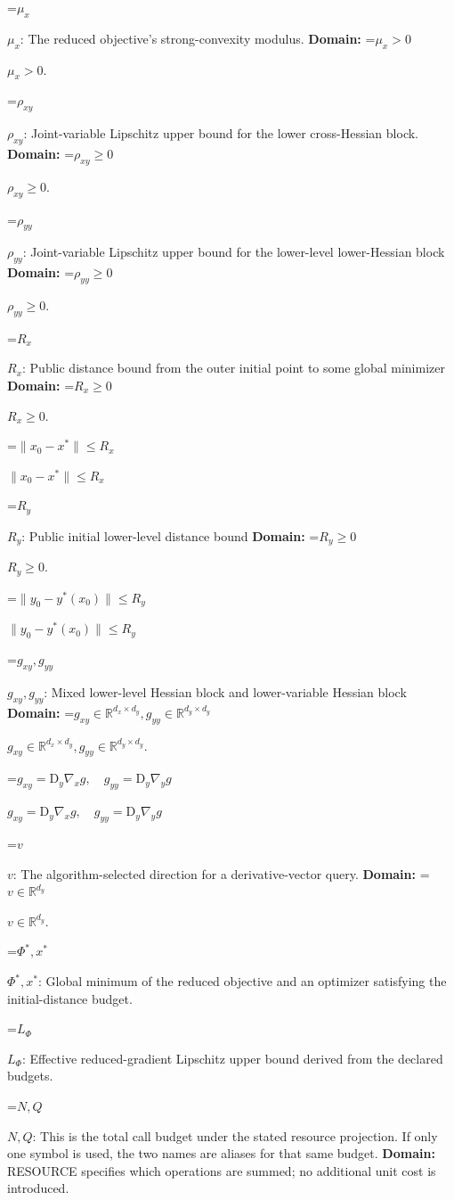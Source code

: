 \documentclass[10pt,a4paper]{article}
\newcommand{\AtlasMath}[1]{\par\begingroup\centering\setbox0=\hbox{$\displaystyle #1$}\ifdim\wd0>1.4\linewidth\typeout{ATLAS WIDE FORMULA: \the\wd0}\fi\ifdim\wd0>\linewidth\resizebox{\linewidth}{!}{\box0}\else\box0\fi\par\endgroup}
\newcommand{\AtlasInlineMath}[1]{\begingroup\setbox0=\hbox{$#1$}\ifdim\wd0>.4\linewidth\endgroup\AtlasMath{#1}\else\endgroup$#1$\fi}
\begin{document}
\AtlasInlineMath{\mu_x}: The reduced objective’s strong-convexity modulus. \textbf{Domain:} \AtlasInlineMath{\mu_x>0}.

\AtlasInlineMath{\rho_{xy}}: Joint-variable Lipschitz upper bound for the lower cross-Hessian block. \textbf{Domain:} \AtlasInlineMath{\rho_{xy}\ge0}.

\AtlasInlineMath{\rho_{yy}}: Joint-variable Lipschitz upper bound for the lower-level lower-Hessian block \textbf{Domain:} \AtlasInlineMath{\rho_{yy}\ge0}.

\AtlasInlineMath{R_x}: Public distance bound from the outer initial point to some global minimizer \textbf{Domain:} \AtlasInlineMath{R_x\ge0}.

\AtlasInlineMath{\|x_0-x^*\|\le R_x}

\AtlasInlineMath{R_y}: Public initial lower-level distance bound \textbf{Domain:} \AtlasInlineMath{R_y\ge0}.

\AtlasInlineMath{\|y_0-y^*(x_0)\|\le R_y}

\AtlasInlineMath{g_{xy},g_{yy}}: Mixed lower-level Hessian block and lower-variable Hessian block \textbf{Domain:} \AtlasInlineMath{g_{xy}\in\mathbb R^{d_x\times d_y},g_{yy}\in\mathbb R^{d_y\times d_y}}.

\AtlasInlineMath{g_{xy}=\mathrm D_y\nabla_xg,\quad g_{yy}=\mathrm D_y\nabla_yg}

\AtlasInlineMath{v}: The algorithm-selected direction for a derivative-vector query. \textbf{Domain:} \AtlasInlineMath{v\in\mathbb R^{d_y}}.

\AtlasInlineMath{\Phi^*,x^*}: Global minimum of the reduced objective and an optimizer satisfying the initial-distance budget.

\AtlasInlineMath{L_\Phi}: Effective reduced-gradient Lipschitz upper bound derived from the declared budgets.

\AtlasInlineMath{N,Q}: This is the total call budget under the stated resource projection. If only one symbol is used, the two names are aliases for that same budget. \textbf{Domain:} RESOURCE specifies which operations are summed; no additional unit cost is introduced.
\end{document}
